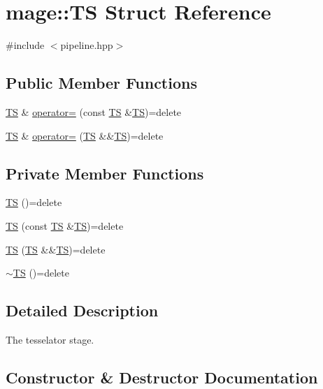 \hypertarget{structmage_1_1_t_s}{}\section{mage\+:\+:TS Struct Reference}
\label{structmage_1_1_t_s}


{\ttfamily \#include $<$pipeline.\+hpp$>$}

\subsection*{Public Member Functions}
\begin{DoxyCompactItemize}
\item 
\hyperlink{structmage_1_1_t_s}{TS} \& \hyperlink{structmage_1_1_t_s_a4c014bfbd6f566d0f222d1d2e78622ee}{operator=} (const \hyperlink{structmage_1_1_t_s}{TS} \&\hyperlink{structmage_1_1_t_s}{TS})=delete
\item 
\hyperlink{structmage_1_1_t_s}{TS} \& \hyperlink{structmage_1_1_t_s_a57d412a0ab77727a95bd4065911695f8}{operator=} (\hyperlink{structmage_1_1_t_s}{TS} \&\&\hyperlink{structmage_1_1_t_s}{TS})=delete
\end{DoxyCompactItemize}
\subsection*{Private Member Functions}
\begin{DoxyCompactItemize}
\item 
\hyperlink{structmage_1_1_t_s_ac972f2fe0e5962a920b22d42ba92c0b9}{TS} ()=delete
\item 
\hyperlink{structmage_1_1_t_s_aba977213bb56427c72793c5705d5e413}{TS} (const \hyperlink{structmage_1_1_t_s}{TS} \&\hyperlink{structmage_1_1_t_s}{TS})=delete
\item 
\hyperlink{structmage_1_1_t_s_a5a40db33a114728d9bc1bdb1c38e748c}{TS} (\hyperlink{structmage_1_1_t_s}{TS} \&\&\hyperlink{structmage_1_1_t_s}{TS})=delete
\item 
\hyperlink{structmage_1_1_t_s_a00e7120957763c34920a4f43e25a6034}{$\sim$\+TS} ()=delete
\end{DoxyCompactItemize}


\subsection{Detailed Description}
The tesselator stage. 

\subsection{Constructor \& Destructor Documentation}
\hypertarget{structmage_1_1_t_s_ac972f2fe0e5962a920b22d42ba92c0b9}{}\label{structmage_1_1_t_s_ac972f2fe0e5962a920b22d42ba92c0b9} 
